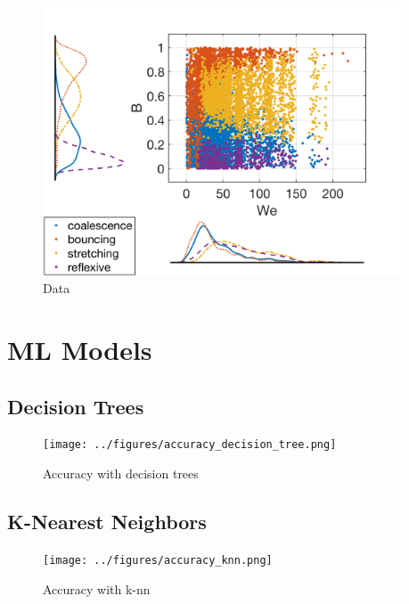 \documentclass{article}
\begin{document}

\clearpage
\begin{figure}[h]
	\centering
	\includegraphics[width=0.95\textwidth]{../figures/data_scatterhist.png}
	\caption{Data}
	\label{fig:data}
\end{figure}

\section{ML Models}
\subsection{Decision Trees}
\begin{figure}[h!]
	\centering
	\texttt{[image: ../figures/accuracy\_decision\_tree.png]}
	\caption{Accuracy with decision trees}
	\label{fig:dt}
\end{figure}

\subsection{K-Nearest Neighbors}
\begin{figure}[h!]
	\centering
	\texttt{[image: ../figures/accuracy\_knn.png]}
	\caption{Accuracy with k-nn}
	\label{fig:dt}
\end{figure}
\end{document}
